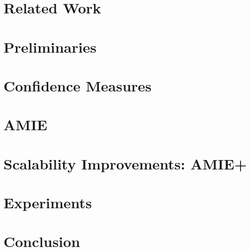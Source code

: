 \documentclass[twocolumn]{svjour3}          %
\begin{document}
\section{Related Work}
\label{sec:relatedWork}



\section{Preliminaries}
\label{sec:preliminaries}



\section{Confidence Measures}
\label{sec:pca}



\section{AMIE}
\label{sec:alg}



\section{Scalability Improvements: AMIE+}
\label{sec:improvements}



\section{Experiments}
\label{sec:experiments}



\section{Conclusion}
\label{sec:conclusion}



\balance
\end{document}
